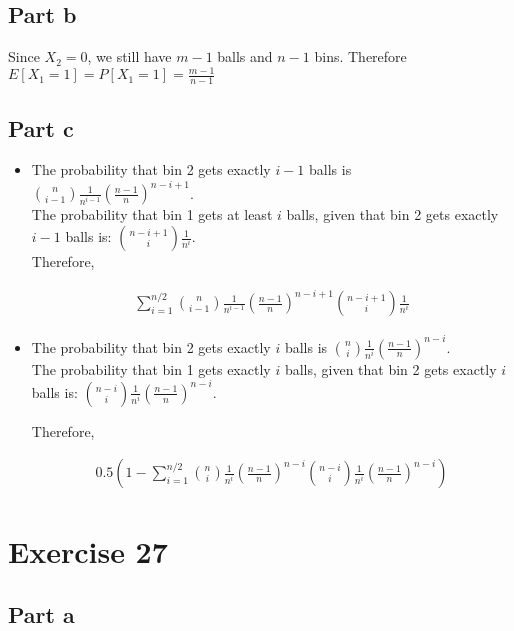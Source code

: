\documentclass[12pt, a4paper]{article}
\begin{document}
\subsection{Part b}
Since $X_2 = 0$, we still have $m-1$ balls and $n-1$ bins. Therefore $E[X_1=1] = P[X_1 = 1] = \frac{m-1}{n-1}$

\subsection{Part c}

\begin{itemize}
  
\item The probability that bin 2 gets exactly $i-1$ balls is
  $\binom{n}{i-1}\frac{1}{n^{i-1}}(\frac{n-1}{n})^{n-i+1}$. \\

  The probability that bin 1 gets at least $i$ balls, given that bin 2 gets
  exactly $i-1$ balls is: $\binom{n-i+1}{i}\frac{1}{n^{i}}$. \\

  Therefore,

  \begin{align*}
    \sum_{i=1}^{n/2}\binom{n}{i-1}\frac{1}{n^{i-1}} (\frac{n-1}{n})^{n-i+1}\binom{n-i+1}{i}\frac{1}{n^{i}}
  \end{align*}

\item The probability that bin 2 gets exactly $i$ balls is
  $\binom{n}{i}\frac{1}{n^{i}}(\frac{n-1}{n})^{n-i}$.\\

  The probability that bin 1 gets exactly $i$ balls, given that bin 2 gets
  exactly $i$ balls is: $\binom{n-i}{i}\frac{1}{n^{i}}(\frac{n-1}{n})^{n-i}$.

  Therefore,

  \begin{align*}
    0.5(1-\sum_{i=1}^{n/2}\binom{n}{i}\frac{1}{n^{i}}(\frac{n-1}{n})^{n-i}\binom{n-i}{i}\frac{1}{n^{i}}(\frac{n-1}{n})^{n-i})
  \end{align*}


\end{itemize}

\section{Exercise 27}
\subsection{Part a}
\end{document}
